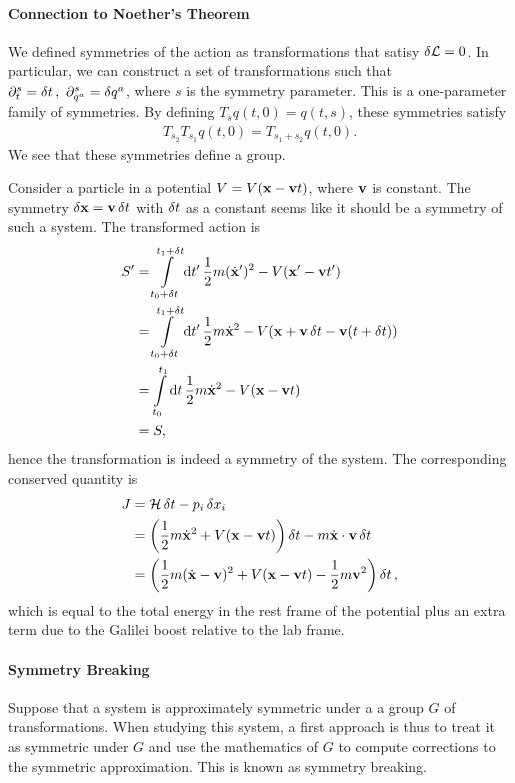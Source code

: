 \paragraph{Connection to Noether's Theorem}
We defined symmetries of the action as transformations that satisy $\var{\ensuremath{\mathcal{L}}} = 0$. In particular, we can construct a set of transformations such that $\partial^{s}_{t} = \var{t},\ \partial^{s}_{q^{a}} = \var{q^{a}}$, where $s$ is the symmetry parameter. This is a one-parameter family of symmetries. By defining $T_{s}q(t, 0) = q(t, s)$, these symmetries satisfy
\begin{align*}
T_{s_{2}}T_{s_{1}}q(t, 0) = T_{s_{1} + s_{2}}q(t, 0).
\end{align*}
We see that these symmetries define a group.

Consider a particle in a potential $V = V(\vb{x} - \vb{v}t)$, where $\vb{v}$ is constant. The symmetry $\var{\vb{x}} = \vb{v}\var{t}$ with $\var{t}$ as a constant seems like it should be a symmetry of such a system. The transformed action is
\begin{align*}
	S^{\prime} &= \int\limits_{t_{0} + \var{t}}^{t_{1} + \var{t}}\dd{t^{\prime}}{\frac{1}{2}m(\dot{\vb{x}}^{\prime})^{2} - V(\vb{x}^{\prime} - \vb{v}t^{\prime})} \\
	           &= \int\limits_{t_{0} + \var{t}}^{t_{1} + \var{t}}\dd{t^{\prime}}{\frac{1}{2}m\dot{\vb{x}}^{2} - V(\vb{x} + \vb{v}\var{t} - \vb{v}(t + \var{t}))} \\
	           &= \int\limits_{t_{0}}^{t_{1}}\dd{t}{\frac{1}{2}m\dot{\vb{x}}^{2} - V(\vb{x} - \vb{v}t)} \\
	           &= S,
\end{align*}
hence the transformation is indeed a symmetry of the system. The corresponding conserved quantity is
\begin{align*}
	J &= \mathcal{H}\var{t} - p_{i}\var{x}_{i} \\
	  &= \left(\frac{1}{2}m\dot{\vb{x}}^{2} + V(\vb{x} - \vb{v}t)\right)\var{t} - m\dot{\vb{x}}\cdot\vb{v}\var{t} \\
	  &= \left(\frac{1}{2}m(\dot{\vb{x}} - \vb{v})^{2} + V(\vb{x} - \vb{v}t) - \frac{1}{2}m\vb{v}^{2}\right)\var{t},
\end{align*}
which is equal to the total energy in the rest frame of the potential plus an extra term due to the Galilei boost relative to the lab frame.

\paragraph{Symmetry Breaking}
Suppose that a system is approximately symmetric under a a group $G$ of transformations. When studying this system, a first approach is thus to treat it as symmetric under $G$ and use the mathematics of $G$ to compute corrections to the symmetric approximation. This is known as symmetry breaking.


